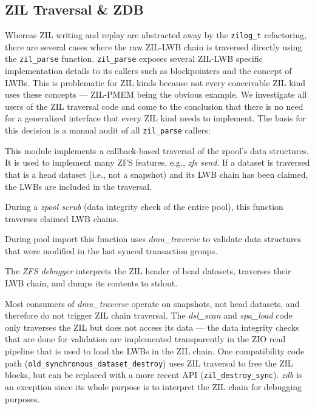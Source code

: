 \documentclass[12pt,a4paper,twoside]{book}
\begin{document}
\subsection{ZIL Traversal \& ZDB}\label{sec:zil_kinds:traversal}
Whereas ZIL writing and replay are abstracted away by the \lstinline{zilog_t} refactoring, there are several cases where the raw ZIL-LWB chain is traversed directly using the \lstinline{zil_parse} function.
\lstinline{zil_parse} exposes several ZIL-LWB specific implementation details to its callers such as blockpointers and the concept of LWBs.
This is problematic for ZIL kinds because not every conceivable ZIL kind uses these concepts --- ZIL-PMEM being the obvious example.
We investigate all users of the ZIL traversal code and come to the conclusion that there is no need for a generalized interface that every ZIL kind needs to implement.
The basis for this decision is a manual audit of all \lstinline{zil_parse} callers:
\begin{description}[noitemsep]
    \item[dmu\_traverse] This module implements a callback-based traversal of the zpool's data structures.
    It is used to implement many ZFS features, e.g., \textit{zfs send}.
    If a dataset is traversed that is a head dataset (i.e., not a snapshot) and its LWB chain has been claimed, the LWBs are included in the traversal.
    \item[dsl\_scan\_zil] During a \textit{zpool scrub} (data integrity check of the entire pool), this function traverses claimed LWB chains.
    \item[spa\_load\_verify] During pool import this function uses \textit{dmu\_traverse} to validate data structures that were modified in the last synced transaction groups.
    \item[zdb\_il.c] The \textit{ZFS debugger} interprets the ZIL header of head datasets, traverses their LWB chain, and dumps its contents to stdout.
\end{description}
Most consumers of \textit{dmu\_traverse} operate on snapshots, not head datasets, and therefore do not trigger ZIL chain traversal.
The \textit{dsl\_scan} and \textit{spa\_load} code only traverses the ZIL but does not access its data --- the data integrity checks that are done for validation are implemented transparently in the ZIO read pipeline that is used to load the LWBs in the ZIL chain.
One compatibility code path (\lstinline{old_synchronous_dataset_destroy}) uses ZIL traversal to free the ZIL blocks, but can be replaced with a more recent API (\lstinline{zil_destroy_sync}).
\textit{zdb} is an exception since its whole purpose is to interpret the ZIL chain for debugging purposes.
\end{document}
